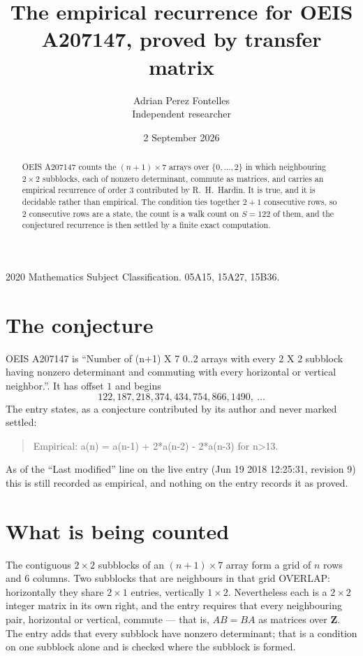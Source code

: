 \documentclass[11pt,a4paper]{article}
\title{The empirical recurrence for OEIS A207147, proved by transfer matrix}
\author{Adrian Perez Fontelles\\ \small Independent researcher}
\date{2 September 2026}
\theoremstyle{plain}
\theoremstyle{definition}
\begin{document}
\maketitle

\begin{abstract}
OEIS A207147 counts the $(n+1)\times7$ arrays over $\{0,\dots,2\}$ in which
neighbouring $2\times2$ subblocks, each of nonzero determinant, commute as matrices, and carries an empirical
recurrence
of order $3$ contributed by R.~H.~Hardin. It is true, and it is decidable rather than
empirical. The condition ties together $2+1$ consecutive rows, so $2$ consecutive rows are
a state, the count is a walk count on $S=122$ of them, and the conjectured recurrence is then
settled by a finite exact computation.
\end{abstract}

\noindent\small 2020 Mathematics Subject Classification. 05A15, 15A27, 15B36.\normalsize

\section{The conjecture}

OEIS A207147 is ``Number of (n+1) X 7 0..2 arrays with every 2 X 2 subblock having nonzero determinant and commuting with every horizontal or vertical neighbor.''. It has offset $1$ and begins
\[
122, 187, 218, 374, 434, 754, 866, 1490,\ \dots
\]
The entry states, as a conjecture contributed by its author and never marked settled:
\begin{quote}
Empirical: a(n) = a(n-1) + 2*a(n-2) - 2*a(n-3) for n>13.
\end{quote}
As of the ``Last modified'' line on the live entry (Jun 19 2018 12:25:31, revision 9) this is still
recorded as empirical, and nothing on the entry records it as proved.

\section{What is being counted}

The contiguous $2\times2$ subblocks of an $(n+1)\times7$ array form a grid of $n$
rows and $6$ columns. Two subblocks that are neighbours in that
grid OVERLAP: horizontally they share $2\times1$ entries, vertically
$1\times2$. Nevertheless each is a $2\times2$ integer matrix in its own right, and
the entry requires that every neighbouring pair, horizontal or vertical, commute --- that is,
$AB=BA$ as matrices over $\mathbf{Z}$. The entry adds that every subblock have nonzero determinant; that is a condition on one subblock alone and is checked where the subblock is formed.
\end{document}
